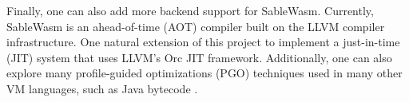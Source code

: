 Finally, one can also add more backend support for SableWasm. Currently, SableWasm is an ahead-of-time (AOT) compiler built on the LLVM compiler infrastructure. One natural extension of this project to implement a just-in-time (JIT) system that uses LLVM's Orc JIT framework. Additionally, one can also explore many profile-guided optimizations (PGO) techniques used in many other VM languages, such as Java bytecode \cite{java-pgo}.